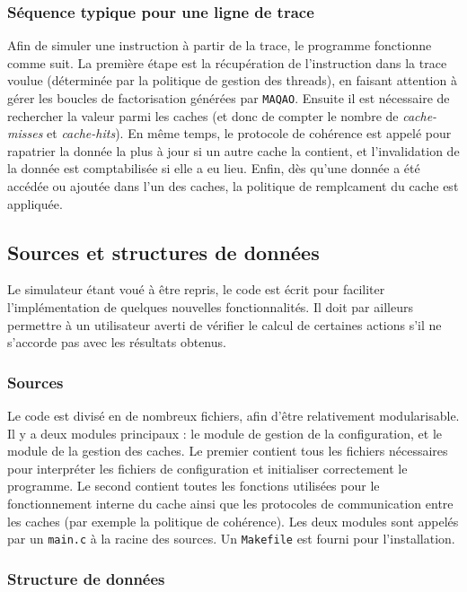 \subsubsection{Séquence typique pour une ligne de trace}

Afin de simuler une instruction à partir de la trace, le programme fonctionne comme suit. La première étape est la récupération de l'instruction dans la trace voulue (déterminée par la politique de gestion des threads), en faisant attention à gérer les boucles de factorisation générées par \texttt{MAQAO}. Ensuite il est nécessaire de rechercher la valeur parmi les caches (et donc de compter le nombre de \emph{cache-misses} et \emph{cache-hits}). En même temps, le protocole de cohérence est appelé pour rapatrier la donnée la plus à jour si un autre cache la contient, et l'invalidation de la donnée est comptabilisée si elle a eu lieu. Enfin, dès qu'une donnée a été accédée ou ajoutée dans l'un des caches, la politique de remplcament du cache est appliquée.

\subsection{Sources et structures de données}

Le simulateur étant voué à être repris, le code est écrit pour faciliter l'implémentation de quelques nouvelles fonctionnalités. Il doit par ailleurs permettre à un utilisateur averti de vérifier le calcul de certaines actions s'il ne s'accorde pas avec les résultats obtenus.

\subsubsection{Sources}

Le code est divisé en de nombreux fichiers, afin d'être relativement modularisable. Il y a deux modules principaux : le module de gestion de la configuration, et le module de la gestion des caches. Le premier contient tous les fichiers nécessaires pour interpréter les fichiers de configuration et initialiser correctement le programme. Le second contient toutes les fonctions utilisées pour le fonctionnement interne du cache ainsi que les protocoles de communication entre les caches (par exemple la politique de cohérence). Les deux modules sont appelés par un \verb!main.c! à la racine des sources. Un \verb!Makefile! est fourni pour l'installation.

\subsubsection{Structure de données}

